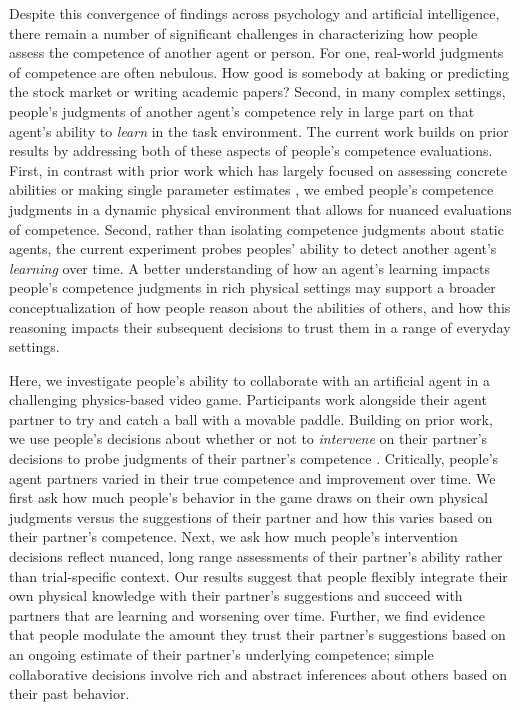 \documentclass[10pt,letterpaper]{article}
\begin{document}
Despite this convergence of findings across psychology and artificial intelligence, there remain a number of significant challenges in characterizing how people assess the competence of another agent or person. For one, real-world judgments of competence are often nebulous. How good is somebody at baking or predicting the stock market or writing academic papers? Second, in many complex settings, people's judgments of another agent's competence rely in large part on that agent's ability to \textit{learn} in the task environment. The current work builds on prior results by addressing both of these aspects of people's competence evaluations. First, in contrast with prior work which has largely focused on assessing concrete abilities or making single parameter estimates \cite{chang2010seeing, chen2020trust, leong2018unrealistic}, we embed people's competence judgments in a dynamic physical environment that allows for nuanced evaluations of competence. Second, rather than isolating competence judgments about static agents, the current experiment probes peoples' ability to detect another agent's \textit{learning} over time. A better understanding of how an agent's learning impacts people's competence judgments in rich physical settings may support a broader conceptualization of how people reason about the abilities of others, and how this reasoning impacts their subsequent decisions to trust them in a range of everyday settings.

Here, we investigate people's ability to collaborate with an artificial agent in a challenging physics-based video game. Participants work alongside their agent partner to try and catch a ball with a movable paddle. Building on prior work, we use people's decisions about whether or not to \textit{intervene} on their partner's decisions to probe judgments of their partner's competence \cite{xie2019robot, chen2020trust}. Critically, people's agent partners varied in their true competence and improvement over time. We first ask how much people's behavior in the game draws on their own physical judgments versus the suggestions of their partner and how this varies based on their partner's competence. Next, we ask how much people's intervention decisions reflect nuanced, long range assessments of their partner's ability rather than trial-specific context. Our results suggest that people flexibly integrate their own physical knowledge with their partner's suggestions and succeed with partners that are learning and worsening over time. Further, we find evidence that people modulate the amount they trust their partner's suggestions based on an ongoing estimate of their partner's underlying competence; simple collaborative decisions involve rich and abstract inferences about others based on their past behavior.
\end{document}
